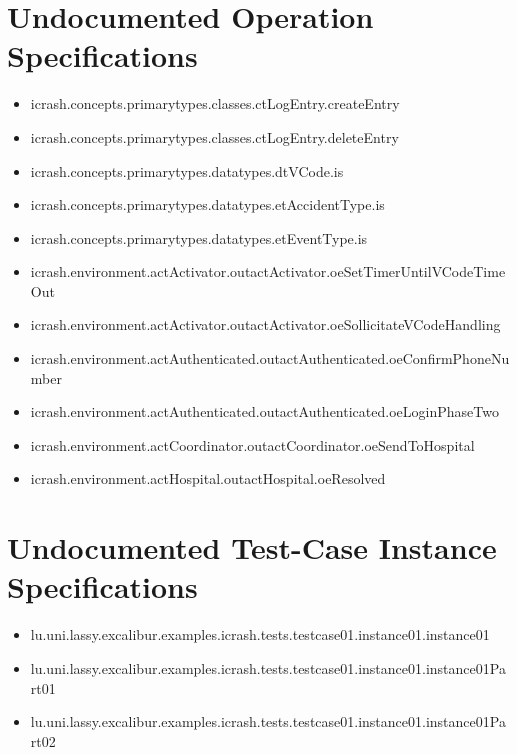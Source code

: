 \section[Undocumented Operation Specifications]{Undocumented Operation Specifications}
\begin{itemize}
\item icrash.concepts.primarytypes.classes.ctLogEntry.createEntry 
\item icrash.concepts.primarytypes.classes.ctLogEntry.deleteEntry 
\item icrash.concepts.primarytypes.datatypes.dtVCode.is 
\item icrash.concepts.primarytypes.datatypes.etAccidentType.is 
\item icrash.concepts.primarytypes.datatypes.etEventType.is 
\item icrash.environment.actActivator.outactActivator.oeSetTimerUntilVCodeTimeOut 
\item icrash.environment.actActivator.outactActivator.oeSollicitateVCodeHandling 
\item icrash.environment.actAuthenticated.outactAuthenticated.oeConfirmPhoneNumber 
\item icrash.environment.actAuthenticated.outactAuthenticated.oeLoginPhaseTwo 
\item icrash.environment.actCoordinator.outactCoordinator.oeSendToHospital 
\item icrash.environment.actHospital.outactHospital.oeResolved 
\end{itemize}





\section[Undocumented Test-Case Instance Specifications]{Undocumented Test-Case Instance Specifications}
\begin{itemize}
\item lu.uni.lassy.excalibur.examples.icrash.tests.testcase01.instance01.instance01 
\item lu.uni.lassy.excalibur.examples.icrash.tests.testcase01.instance01.instance01Part01 
\item lu.uni.lassy.excalibur.examples.icrash.tests.testcase01.instance01.instance01Part02 
\end{itemize}



